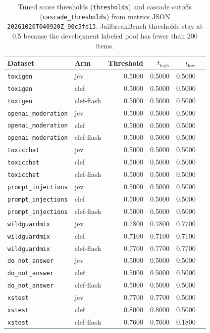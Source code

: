 \begin{table}[htbp]
\centering
\caption{Tuned score thresholds (\texttt{thresholds}) and cascade cutoffs (\texttt{cascade\_thresholds}) from metrics JSON \texttt{20261020T040920Z\_90c5fd13}. JailbreakBench thresholds stay at 0.5 because the development labeled pool has fewer than 200 items.}
\label{tab:thresholds-cascade}
\small
\begin{tabular}{@{}llrrrr@{}}
\toprule
Dataset & Arm & Threshold & $t_{\mathrm{high}}$ & $t_{\mathrm{low}}$ \\
\midrule
\texttt{toxigen} & jev & 0.5000 & 0.5000 & 0.5000 \\
\texttt{toxigen} & clef & 0.5000 & 0.5000 & 0.5000 \\
\texttt{toxigen} & clef-flash & 0.5000 & 0.5000 & 0.5000 \\
\texttt{openai\_moderation} & jev & 0.5000 & 0.5000 & 0.5000 \\
\texttt{openai\_moderation} & clef & 0.5000 & 0.5000 & 0.5000 \\
\texttt{openai\_moderation} & clef-flash & 0.5000 & 0.5000 & 0.5000 \\
\texttt{toxicchat} & jev & 0.5000 & 0.5000 & 0.5000 \\
\texttt{toxicchat} & clef & 0.5000 & 0.5000 & 0.5000 \\
\texttt{toxicchat} & clef-flash & 0.5000 & 0.5000 & 0.5000 \\
\texttt{prompt\_injections} & jev & 0.5000 & 0.5000 & 0.5000 \\
\texttt{prompt\_injections} & clef & 0.5000 & 0.5000 & 0.5000 \\
\texttt{prompt\_injections} & clef-flash & 0.5000 & 0.5000 & 0.5000 \\
\texttt{wildguardmix} & jev & 0.7800 & 0.7800 & 0.7700 \\
\texttt{wildguardmix} & clef & 0.7100 & 0.7100 & 0.7100 \\
\texttt{wildguardmix} & clef-flash & 0.7700 & 0.7700 & 0.7700 \\
\texttt{do\_not\_answer} & jev & 0.5000 & 0.5000 & 0.5000 \\
\texttt{do\_not\_answer} & clef & 0.5000 & 0.5000 & 0.5000 \\
\texttt{do\_not\_answer} & clef-flash & 0.5000 & 0.5000 & 0.5000 \\
\texttt{xstest} & jev & 0.7700 & 0.7700 & 0.5000 \\
\texttt{xstest} & clef & 0.8000 & 0.8000 & 0.5000 \\
\texttt{xstest} & clef-flash & 0.7600 & 0.7600 & 0.1800 \\

\end{tabular}
\end{table}
